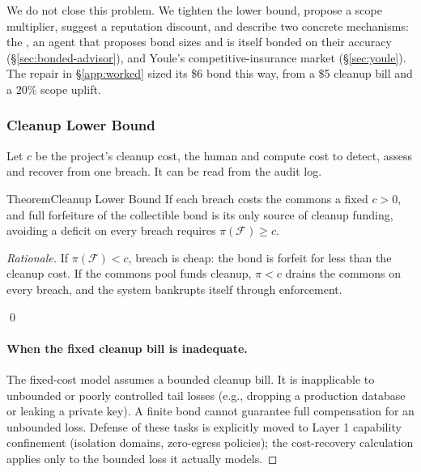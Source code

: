 \documentclass[11pt,a4paper]{article}
\theoremstyle{definition}
\theoremstyle{remark}
\begin{document}
We do not close this problem. We tighten the lower bound, propose a scope multiplier, suggest a reputation discount, and describe two concrete mechanisms: the , an agent that proposes bond sizes and is itself bonded on their accuracy (\S\ref{sec:bonded-advisor}), and Youle's competitive-insurance market (\S\ref{sec:youle}). The repair in \S\ref{app:worked} sized its \$6 bond this way, from a \$5 cleanup bill and a $20\%$ scope uplift.

\subsubsection{Cleanup Lower Bound}\label{sec:cleanup-bound}

Let $c$ be the project's cleanup cost, the human and compute cost to detect, assess and recover from one breach. It can be read from the audit log.
%

\begin{pdclaim}{Theorem}{Cleanup Lower Bound}
\setlength{\parskip}{4pt plus 1pt}
\label{thm:cleanup-bound}
If each breach costs the commons a fixed $c>0$, and full forfeiture of the
collectible bond is its only source of cleanup funding, avoiding a deficit
on every breach requires $\pi(\mathcal F)\ge c$.
\end{pdclaim}

\begin{proof}[Rationale]
\setlength{\parskip}{4pt plus 1pt}
If $\pi(\mathcal{F}) < c$, breach is cheap: the bond is forfeit for less than the cleanup cost. If the commons pool funds cleanup, $\pi < c$ drains the commons on every breach, and the system bankrupts itself through enforcement.

\qed

\paragraph{When the fixed cleanup bill is inadequate.}
The fixed-cost model assumes a bounded cleanup bill. It is inapplicable to unbounded or poorly controlled tail losses (e.g., dropping a production database or leaking a private key). A finite bond cannot guarantee full compensation for an unbounded loss. Defense of these tasks is explicitly moved to Layer 1 capability confinement (isolation domains, zero-egress policies); the cost-recovery calculation applies only to the bounded loss it actually models.
\end{proof}
\end{document}
